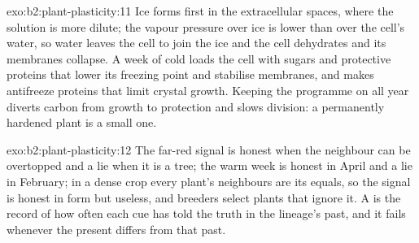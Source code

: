 \begin{solution}{exo:b2:plant-plasticity:11}
Ice forms first in the extracellular spaces, where the solution is
more dilute; the vapour pressure over ice is lower than over the
cell's water, so water leaves the cell to join the ice and the cell
dehydrates and its membranes collapse. A week of cold loads the
cell with sugars and protective proteins that lower its freezing
point and stabilise membranes, and makes antifreeze proteins that
limit crystal growth. Keeping the programme on all year diverts
carbon from growth to protection and slows division: a permanently
hardened plant is a small one.
\end{solution}

\begin{solution}{exo:b2:plant-plasticity:12}
The far-red signal is honest when the neighbour can be overtopped
and a lie when it is a tree; the warm week is honest in April and
a lie in February; in a dense crop every plant's neighbours are its
equals, so the signal is honest in form but useless, and breeders
select plants that ignore it. A  is the record of
how often each cue has told the truth in the lineage's past, and it
fails whenever the present differs from that past.
\end{solution}

